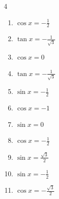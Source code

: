 \begin{multicols}{4}
\begin{enumerate}

  \item $\displaystyle \cos{x}  = -\frac{1}{2}$


\columnbreak %

  \item $\displaystyle \tan{x}  = -\frac{1}{\sqrt{3}}$


  \item $\displaystyle \cos{x}  = 0$


  \item $\displaystyle \tan{x}  = -\frac{1}{\sqrt{3}}$


  \item $\displaystyle \sin{x}  = -\frac{1}{2}$


  \item $\displaystyle \cos{x}  = -1$


  \item $\displaystyle \sin{x}  = 0$


  \item $\displaystyle \cos{x}  = -\frac{1}{2}$


  \item $\displaystyle \sin{x}  = \frac{\sqrt{3}}{2}$


  \item $\displaystyle \sin{x}  = -\frac{1}{2}$


  \item $\displaystyle \cos{x}  = -\frac{\sqrt{3}}{2}$


\end{enumerate}
\end{multicols}
